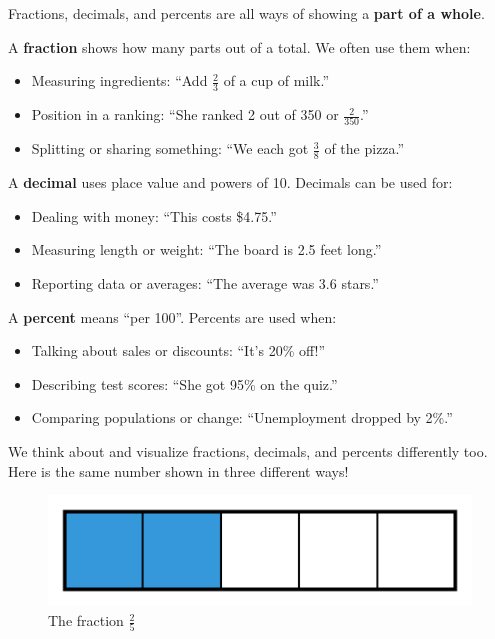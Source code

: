 \documentclass[
  letterpaper,
  DIV=11,
  numbers=noendperiod]{scrreprt}
\providecommand{\tightlist}{%
  \setlength{\itemsep}{0pt}\setlength{\parskip}{0pt}}
\begin{document}
Fractions, decimals, and percents are all ways of showing a \textbf{part
of a whole}.

A \textbf{fraction} shows how many parts out of a total. We often use
them when:

\begin{itemize}
\tightlist
\item
  Measuring ingredients: ``Add \(\frac{2}{3}\) of a cup of milk.''
\item
  Position in a ranking: ``She ranked 2 out of 350 or
  \(\frac{2}{350}\).''
\item
  Splitting or sharing something: ``We each got \(\frac{3}{8}\) of the
  pizza.''
\end{itemize}

A \textbf{decimal} uses place value and powers of 10. Decimals can be
used for:

\begin{itemize}
\tightlist
\item
  Dealing with money: ``This costs \$4.75.''
\item
  Measuring length or weight: ``The board is 2.5 feet long.''
\item
  Reporting data or averages: ``The average was 3.6 stars.''
\end{itemize}

A \textbf{percent} means ``per 100''. Percents are used when:

\begin{itemize}
\tightlist
\item
  Talking about sales or discounts: ``It's 20\% off!''
\item
  Describing test scores: ``She got 95\% on the quiz.''
\item
  Comparing populations or change: ``Unemployment dropped by 2\%.''
\end{itemize}

We think about and visualize fractions, decimals, and percents
differently too. Here is the same number shown in three different ways!

\begin{figure}[H]

{\centering \includegraphics[width=0.33\linewidth,height=\textheight,keepaspectratio]{images/Unit_1/Lesson_4/fraction_2_fifths.png}

}

\caption{The fraction \(\frac{2}{5}\)}

\end{figure}%
\end{document}
